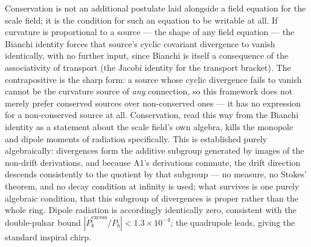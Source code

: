 \documentclass[pdflatex,sn-mathphys-num]{sn-jnl}
\theoremstyle{thmstyleone}
\theoremstyle{thmstylethree}
\theoremstyle{thmstyletwo}
\begin{document}
Conservation is not an additional postulate laid alongside a field
equation for the scale field; it is the condition for such an equation
to be writable at all. If curvature is proportional to a source — the
shape of any field equation — the Bianchi identity forces that source's
cyclic covariant divergence to vanish identically, with no further
input, since Bianchi is itself a consequence of the associativity of
transport (the Jacobi identity for the transport bracket). The
contrapositive is the sharp form: a source whose cyclic divergence fails
to vanish cannot be the curvature source of \emph{any} connection, so
this framework does not merely prefer conserved sources over
non-conserved ones — it has no expression for a non-conserved source at
all. Conservation, read this way from the Bianchi identity as a
statement about the scale field's own algebra, kills the monopole and
dipole moments of radiation specifically. This is established purely algebraically: divergences form the
additive subgroup generated by images of the non-drift derivations, and
because A1's derivations commute, the drift direction descends
consistently to the quotient by that subgroup — no measure, no Stokes'
theorem, and no decay condition at infinity is used; what survives is one
purely algebraic condition, that this subgroup of divergences is proper
rather than the whole ring. Dipole radiation is accordingly identically
zero, consistent with the double-pulsar bound
$|\dot P_b^{\text{excess}}/\dot P_b|<1.3\times10^{-4}$; the quadrupole
leads, giving the standard inspiral chirp.
\end{document}
